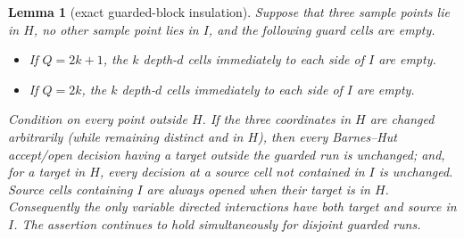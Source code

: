 \documentclass[11pt]{article}
\numberwithin{equation}{section}
\newtheorem{lemma}[theorem]{Lemma}
\newcommand{\1}{\mathbf 1}\newcommand{\F}{\mathcal F}\newcommand{\D}{\mathcal D}
\begin{document}
\begin{lemma}[exact guarded-block insulation]\label{lem:exact-insulation-d}
Suppose that three sample points lie in $H$, no other sample point lies in
$I$, and the following guard cells are empty.
\begin{itemize}
\item If $Q=2k+1$, the $k$ depth-$d$ cells immediately to each side of $I$
are empty.
\item If $Q=2k$, the $k$ depth-$d$ cells immediately to each side of $I$
are empty.
\end{itemize}
Condition on every point outside $H$.  If the three coordinates in $H$ are
changed arbitrarily (while remaining distinct and in $H$), then every
Barnes--Hut accept/open decision having a target outside the guarded run is
unchanged; and, for a target in $H$, every decision at a source cell not
contained in $I$ is unchanged.  Source cells containing $I$ are always
opened when their target is in $H$.  Consequently the only variable
directed interactions have both target and source in $I$.  The assertion
continues to hold simultaneously for disjoint guarded runs.
\end{lemma}
\end{document}
